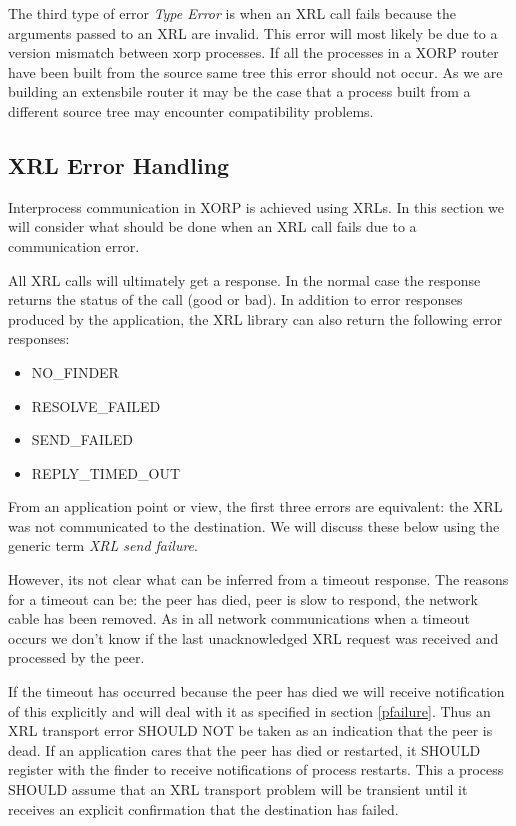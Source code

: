 \documentclass[11pt]{article}
\begin{document}
The third type of error {\em Type Error} is when an XRL call fails
because the arguments passed to an XRL are invalid. This error will
most likely be due to a version mismatch between xorp processes. If
all the processes in a XORP router have been built from the source
same tree this error should not occur. As we are building an
extensbile router it may be the case that a process built from a
different source tree may encounter compatibility problems.

\subsection{XRL Error Handling}
Interprocess communication in XORP is achieved using XRLs. In this
section we will consider what should be done when an XRL call fails
due to a communication error.

All XRL calls will ultimately get a response. In the normal case the
response returns the status of the call (good or bad). In addition to
error responses produced by the application, the XRL library can also
return the following error responses:
\begin{itemize}
\item NO\_FINDER
\item RESOLVE\_FAILED
\item SEND\_FAILED
\item REPLY\_TIMED\_OUT
\end{itemize}
From an application point or view, the first three errors are
equivalent: the XRL was not communicated to the destination.  We will
discuss these below using the generic term {\em XRL send failure}.

However, its not clear what can be inferred from a timeout
response. The reasons for a timeout can be: the peer has died, peer is
slow to respond, the network cable has been removed. As in all network
communications when a timeout occurs we don't know if the last
unacknowledged XRL request was received and processed by the peer.

If the timeout has occurred because the peer has died we will receive
notification of this explicitly and will deal with it as specified in
section \ref{pfailure}.  Thus an XRL transport error SHOULD NOT be
taken as an indication that the peer is dead.  If an application cares
that the peer has died or restarted, it SHOULD register with the
finder to receive notifications of process restarts.  This a process
SHOULD assume that an XRL transport problem will be transient until it
receives an explicit confirmation that the destination has failed. 
\end{document}
